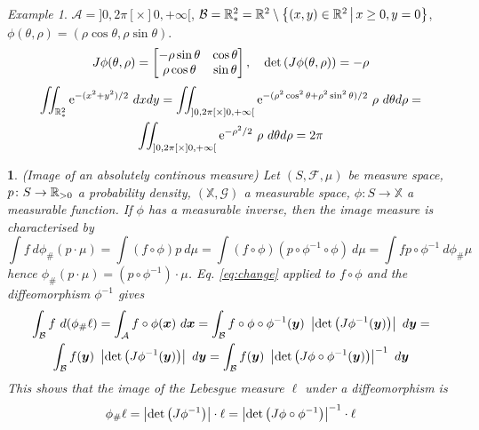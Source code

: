 \documentclass[12pt,a4paper]{amsart}
\newcommand{\by}{\bm y}
\theoremstyle{plain}%
\newtheorem{npar}{}%
\theoremstyle{definition}
\theoremstyle{remark}
\newtheorem{example}{Example}
\begin{document}
\begin{example}
  $\mathcal A = ]0,2\pi[\times]0,+\infty[$, $\mathcal B = \mathbb{R}^2_* = \mathbb{R}^2 \setminus \left\{(x,y)\in\mathbb{R}^2 \, \middle| \, x\ge0,y=0 \right\}$, $\phi(\theta,\rho)=(\rho\cos \theta,\rho\sin \theta)$.
\begin{equation*}
  J\phi(\theta,\rho) = \begin{bmatrix}
- \rho \sin\theta & \cos \theta \\ \rho \cos \theta & \sin \theta  \end{bmatrix}
, \quad \operatorname{det}\left(J\phi(\theta,\rho)\right) = - \rho\end{equation*}
\begin{multline*}
\iint_{\mathbb{R}^2_*} \mathrm{e}^{-(x^2+y^2)/2} \ dxdy = \iint_{]0,2\pi[\times]0,+\infty[} \mathrm{e}^{-(\rho^2\cos^2 \theta+ \rho^2 \sin^2 \theta)/2} \ \rho \ d\theta d\rho = \\ \iint_{]0,2\pi[\times]0,+\infty[} \mathrm{e}^{-\rho^2/2} \ \rho \ d\theta d\rho = 2\pi   
\end{multline*}
\end{example}
\begin{npar}(Image of an absolutely continous measure)\normalfont
  Let $(S,\mathcal F,\mu)$ be measure space, $p \colon S \to \mathbb{R}_{>0}$ a probability density, $(\mathbb X,\mathcal G)$ a measurable space, $\phi \colon S \to \mathbb X$ a measurable function. If $\phi$ has a measurable inverse, then the image measure is characterised by
  \begin{equation*}
    \int f \ d\phi_{\#}(p \cdot \mu) = \int (f\circ \phi) p \ d\mu = \int (f\circ\phi) (p\circ\phi^{-1}\circ\phi) \ d\mu = \int f p\circ\phi^{-1} \  d\phi_{\#} \mu 
  \end{equation*}
hence $\phi_{\#}(p \cdot \mu) = (p\circ\phi^{-1})\cdot\mu$. Eq. \eqref{eq:change}
applied to $f \circ \phi$ and the diffeomorphism $\phi^{-1}$ gives 
\begin{multline*}
  \int_{\mathcal B} f \ d(\phi_{\#}\ell) = \int_{\mathcal A} f\circ\phi(\bx) \ d\bx = \int_{\mathcal B} f\circ\phi\circ\phi^{-1}(\by) \ \absoluteval{\detof{J\phi^{-1}(\by)}} \ d\by = \\ \int_{\mathcal B} f(\by) \ \absoluteval{\detof{J\phi^{-1}(\by)}} \ d\by = \int_{\mathcal B} f(\by) \ \absoluteval{\detof{J\phi\circ\phi^{-1}(\by)}}^{-1} \ d\by
\end{multline*}
This shows that the image of the Lebesgue measure $\ell$ under a diffeomorphism is
\begin{equation*}%
  \phi_{\#}\ell = \absoluteval{\detof{J\phi^{-1}}}\cdot\ell = \absoluteval{\detof{J\phi\circ\phi^{-1}}}^{-1} \cdot \ell  
\end{equation*}
\end{npar}
\end{document}
